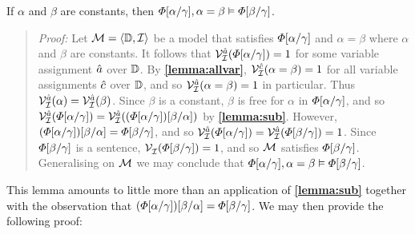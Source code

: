 \begin{Lthm} \label{lemma:id}
  If $\alpha$ and $\beta$ are constants, then $\varPhi[\alpha/\gamma], \alpha = \beta \vDash \varPhi[\beta/\gamma]$.
\end{Lthm}

\begin{quote} 
  \textit{Proof:} Let $\mathcal{M}=\langle\mathbb{D},\mathcal{I}\rangle$ be a model that satisfies $\varPhi[\alpha/\gamma]$ and $\alpha = \beta$ where $\alpha$ and $\beta$ are constants. 
  It follows that $\mathcal{V}_{\mathcal{I}}^{\hat{a}}(\varPhi[\alpha/\gamma])=1$ for some variable assignment $\hat{a}$ over $\mathbb{D}$.
  By \textbf{\ref{lemma:allvar}}, $\mathcal{V}_{\mathcal{I}}^{\hat{c}}(\alpha=\beta)=1$ for all variable assignments $\hat{c}$ over $\mathbb{D}$, and so $\mathcal{V}_{\mathcal{I}}^{\hat{a}}(\alpha=\beta)=1$ in particular.
  Thus $\mathcal{V}_{\mathcal{I}}^{\hat{a}}(\alpha)=\mathcal{V}_{\mathcal{I}}^{\hat{a}}(\beta)$.
  Since $\beta$ is a constant, $\beta$ is free for $\alpha$ in $\varPhi[\alpha/\gamma]$, and so $\mathcal{V}_{\mathcal{I}}^{\hat{a}}(\varPhi[\alpha/\gamma])=\mathcal{V}_{\mathcal{I}}^{\hat{a}}((\varPhi[\alpha/\gamma])[\beta/\alpha])$ by \textbf{\ref{lemma:sub}}.
  However, $(\varPhi[\alpha/\gamma])[\beta/\alpha]=\varPhi[\beta/\gamma]$, and so $\mathcal{V}_{\mathcal{I}}^{\hat{a}}(\varPhi[\alpha/\gamma])=\mathcal{V}_{\mathcal{I}}^{\hat{a}}(\varPhi[\beta/\gamma])=1$.
  Since $\varPhi[\beta/\gamma]$ is a sentence, $\mathcal{V}_{\mathcal{I}}^{}(\varPhi[\beta/\gamma])=1$, and so $\mathcal{M}$ satisfies $\varPhi[\beta/\gamma]$. 
  Generalising on $\mathcal{M}$ we may conclude that $\varPhi[\alpha/\gamma], \alpha = \beta \vDash \varPhi[\beta/\gamma]$. 
\end{quote}

This lemma amounts to little more than an application of \textbf{\ref{lemma:sub}} together with the observation that $(\varPhi[\alpha/\gamma])[\beta/\alpha]=\varPhi[\beta/\gamma]$.
We may then provide the following proof:





